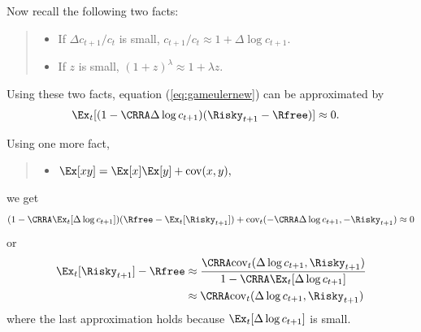 \documentclass{handout}
\begin{document}
\clearpage 

\noindent Now recall the following two facts:

\begin{quote}
\begin{itemize}

\item[Fact 1: ] If $\Delta c_{t+1}/c_{t}$ is small, $c_{t+1}/c_{t} \approx 1+ \Delta \log c_{t+1}.$

\item[Fact 2: ] If $z$ is small, $(1+z)^{\lambda} \approx 1 + \lambda z$.

\end{itemize}
\end{quote}

\noindent Using these two facts, equation (\ref{eq:gameulernew}) can be approximated by
\begin{equation}\begin{gathered}\begin{aligned}
        \Ex_{t}[(1-\CRRA \Delta \log {c}_{t+1})(\Risky_{t+1}-\Rfree)] & \approx  0.
\end{aligned}\end{gathered}\end{equation}

\noindent Using one more fact,
\begin{quote}
\begin{itemize}
\item[Fact 3:] $\Ex [xy] = \Ex [x]\Ex [y] + \text{cov}(x,y),$
\end{itemize}
\end{quote}
we get
\begin{equation}
        (1-\CRRA \Ex_{t}[\Delta \log {c}_{t+1}])(\Rfree - \Ex_{t}[\Risky_{t+1}])+\text{cov}_{t}(-\CRRA \Delta \log {c}_{t+1},-\Risky_{t+1})  \approx  0  
\end{equation}
or
\begin{equation}\begin{gathered}\begin{aligned}
        \Ex_{t}[\Risky_{t+1}]-\Rfree & \approx  \frac{\CRRA \text{cov}_{t}(\Delta \log {c}_{t+1},\Risky_{t+1})}{1-\CRRA \Ex_{t}[ \Delta \log {c}_{t+1}]} 
\\                             & \approx  \CRRA \text{cov}_{t}(\Delta \log {c}_{t+1},\Risky_{t+1}) \label{eq:eqprem}
\end{aligned}\end{gathered}\end{equation}
\noindent where the last approximation holds because $\Ex_{t}[\Delta 
\log {c}_{t+1}]$ is small.  
\end{document}
